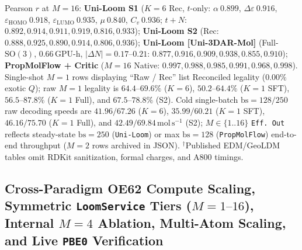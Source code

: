 \documentclass[11pt,a4paper]{article}
\begin{document}
\begin{table}[t]
{Pearson $r$ at $M=16$: \textbf{Uni-Loom S1} ($K=6$ Rec, $t$-only: $\alpha\ 0.899$, $\Delta\varepsilon\ 0.916$, $\varepsilon_{\text{HOMO}}\ 0.918$, $\varepsilon_{\text{LUMO}}\ 0.935$, $\mu\ 0.840$, $C_v\ 0.936$; $t+N$: $0.892, 0.914, 0.911, 0.919, 0.816, 0.933$); \textbf{Uni-Loom S2} (Rec: $0.888, 0.925, 0.890, 0.914, 0.806, 0.936$); \textbf{Uni-Loom [Uni-3DAR-Mol]} (Full-$\text{SO}(3)$, $0.66\,\text{GPU-h}$, $|\Delta N|=0.17\text{--}0.21$: $0.877, 0.916, 0.909, 0.938, 0.855, 0.910$); \textbf{PropMolFlow + Critic} ($M=16$ Native: $0.997, 0.988, 0.985, 0.991, 0.968, 0.998$). Single-shot $M=1$ rows displaying ``Raw / Rec'' list Reconciled legality ($0.00\%$ exotic $Q$); raw $M=1$ legality is $64.4\text{--}69.6\%$ ($K=6$), $50.2\text{--}64.4\%$ ($K=1$ SFT), $56.5\text{--}87.8\%$ ($K=1$ Full), and $67.5\text{--}78.8\%$ (S2). Cold single-batch $\text{bs}=128/250$ raw decoding speeds are $41.96/67.26$ ($K=6$), $35.99/60.21$ ($K=1$ SFT), $46.16/75.70$ ($K=1$ Full), and $42.49/69.84\,\text{mol}\,\text{s}^{-1}$ (S2); $M\in\{1..16\}$ \texttt{Eff.\ Out} reflects steady-state $\text{bs}=250$ (\texttt{Uni-Loom}) or max $\text{bs}=128$ (\texttt{PropMolFlow}) end-to-end throughput ($M=2$ rows archived in JSON). $^\dagger$Published EDM/GeoLDM tables omit RDKit sanitization, formal charges, and A800 timings.}
\end{table}

\subsection{Cross-Paradigm OE62 Compute Scaling, Symmetric \texttt{LoomService} Tiers ($M=1\text{--}16$), Internal $M=4$ Ablation, Multi-Atom Scaling, and Live \texttt{PBE0} Verification}
\label{sec:exp_oe62_scaling}
\end{document}
